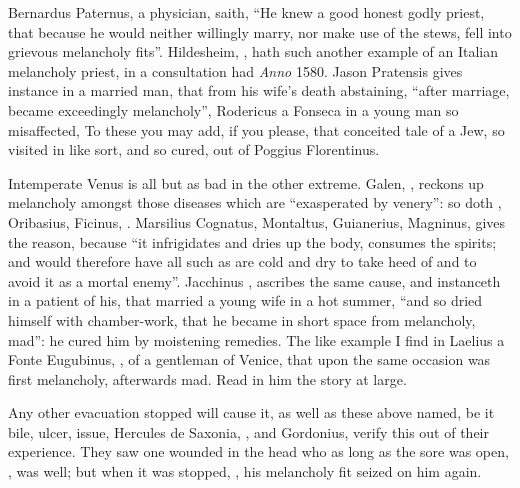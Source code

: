 Bernardus Paternus, a physician, saith, \enquote{He knew a good
honest godly priest, that because he would neither willingly marry, nor make
use of the stews, fell into grievous melancholy fits}. Hildesheim,
, hath such another example of an Italian
melancholy priest, in a consultation had \emph{Anno} 1580. Jason Pratensis
gives instance in a married man, that from his wife's death abstaining,
\enquote{after marriage, became exceedingly melancholy}, Rodericus
a Fonseca in a young man so misaffected,  To these you may add, if you please, that conceited tale of a Jew, so
visited in like sort, and so cured, out of Poggius Florentinus.

Intemperate Venus is all but as bad in the other extreme. Galen,
, reckons up
melancholy amongst those diseases which are \enquote{exasperated
by venery}: so doth \Avicenna{},  Oribasius,
 Ficinus, . Marsilius Cognatus, Montaltus,  Guianerius,  Magninus,
 gives the reason,
because \enquote{it infrigidates and dries up the body, consumes
the spirits; and would therefore have all such as are cold and dry to take heed
of and to avoid it as a mortal enemy}. Jacchinus , ascribes the same cause, and instanceth in a patient of his,
that married a young wife in a hot summer, \enquote{and so dried
himself with chamber-work, that he became in short space from melancholy, mad}:
he cured him by moistening remedies. The like example I find in Laelius a Fonte
Eugubinus, , of a gentleman of Venice, that
upon the same occasion was first melancholy, afterwards mad. Read in him the
story at large.

Any other evacuation stopped will cause it, as well as these above named, be it
bile, ulcer, issue, \etc{} Hercules de Saxonia,
, and Gordonius, verify this out of their
experience. They saw one wounded in the head who as long as the sore was open,
, was well; but when it was stopped,
, his melancholy fit seized on him again.

